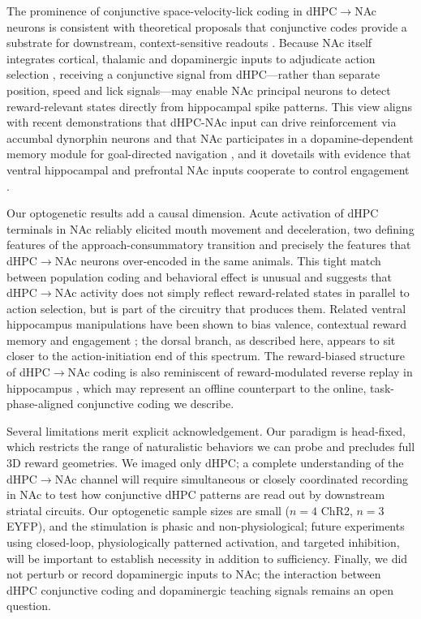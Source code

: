 \documentclass[11pt]{article}
\begin{document}
The prominence of conjunctive space-velocity-lick coding in dHPC$\rightarrow$NAc neurons is consistent with theoretical proposals that conjunctive codes provide a substrate for downstream, context-sensitive readouts \citep{Xiao2020Conjunctive}. Because NAc itself integrates cortical, thalamic and dopaminergic inputs to adjudicate action selection \citep{Mogenson1980Motivation,Britt2012Synaptic,Jung2024Dopamine}, receiving a conjunctive signal from dHPC---rather than separate position, speed and lick signals---may enable NAc principal neurons to detect reward-relevant states directly from hippocampal spike patterns. This view aligns with recent demonstrations that dHPC-NAc input can drive reinforcement via accumbal dynorphin neurons \citep{Ibrahim2024DorsalHPC} and that NAc participates in a dopamine-dependent memory module for goal-directed navigation \citep{Jung2024Dopamine}, and it dovetails with evidence that ventral hippocampal and prefrontal NAc inputs cooperate to control engagement \citep{Iyer2025Engagement}.

Our optogenetic results add a causal dimension. Acute activation of dHPC terminals in NAc reliably elicited mouth movement and deceleration, two defining features of the approach-consummatory transition and precisely the features that dHPC$\rightarrow$NAc neurons over-encoded in the same animals. This tight match between population coding and behavioral effect is unusual and suggests that dHPC$\rightarrow$NAc activity does not simply reflect reward-related states in parallel to action selection, but is part of the circuitry that produces them. Related ventral hippocampus manipulations have been shown to bias valence, contextual reward memory and engagement \citep{Ciocchi2015Selective,Nguyen2024Cholecystokinin,Iyer2025Engagement,Bakoyiannis2023Pathway}; the dorsal branch, as described here, appears to sit closer to the action-initiation end of this spectrum. The reward-biased structure of dHPC$\rightarrow$NAc coding is also reminiscent of reward-modulated reverse replay in hippocampus \citep{Ambrose2016Replay}, which may represent an offline counterpart to the online, task-phase-aligned conjunctive coding we describe.

Several limitations merit explicit acknowledgement. Our paradigm is head-fixed, which restricts the range of naturalistic behaviors we can probe and precludes full 3D reward geometries. We imaged only dHPC; a complete understanding of the dHPC$\rightarrow$NAc channel will require simultaneous or closely coordinated recording in NAc to test how conjunctive dHPC patterns are read out by downstream striatal circuits. Our optogenetic sample sizes are small ($n=4$ ChR2, $n=3$ EYFP), and the stimulation is phasic and non-physiological; future experiments using closed-loop, physiologically patterned activation, and targeted inhibition, will be important to establish necessity in addition to sufficiency. Finally, we did not perturb or record dopaminergic inputs to NAc; the interaction between dHPC conjunctive coding and dopaminergic teaching signals \citep{Mamad2017PlaceField,Jung2024Dopamine} remains an open question.
\end{document}
